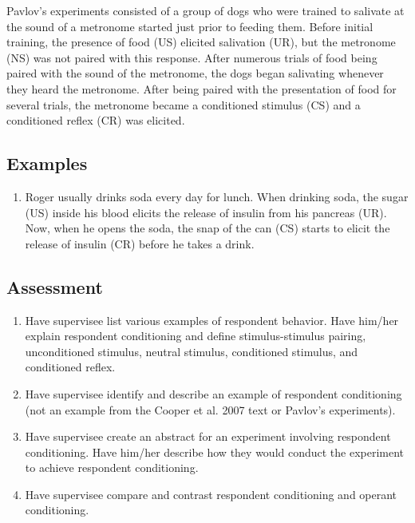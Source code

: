 Pavlov's experiments consisted of a group of dogs who were trained to salivate at the sound of a metronome started just prior to feeding them. Before initial training, the presence of food (US) elicited salivation (UR), but the metronome (NS) was not paired with this response. After numerous trials of food being paired with the sound of the metronome, the dogs began salivating whenever they heard the metronome. After being paired with the presentation of food for several trials, the metronome became a conditioned stimulus (CS) and a conditioned reflex (CR) was elicited. 

\subsection{Examples}
\begin{enumerate}
\item Roger usually drinks soda every day for lunch. When drinking soda, the sugar (US) inside his blood elicits the release of insulin from his pancreas (UR). Now, when he opens the soda, the snap of the can (CS) starts to elicit the release of insulin (CR) before he takes a drink. 
%
\end{enumerate}
%
\subsection{Assessment}
\begin{enumerate}
\item Have supervisee list various examples of respondent behavior. Have him/her explain respondent conditioning and define stimulus-stimulus pairing, unconditioned stimulus, neutral stimulus, conditioned stimulus, and conditioned reflex.
\item Have supervisee identify and describe an example of respondent conditioning (not an example from the Cooper et al. 2007 text or Pavlov's experiments). 
\item Have supervisee create an abstract for an experiment involving respondent conditioning. Have him/her describe how they would conduct the experiment to achieve respondent conditioning.
\item Have supervisee compare and contrast respondent conditioning and operant conditioning.
\end{enumerate}
%
